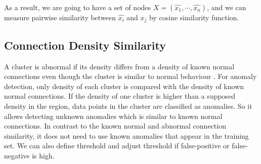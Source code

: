 As a result, we are going to have a set of nodes $X = (\hat{x_1}, \cdots, \hat{x_n})$, and we can measure pairwise similarity between $\hat{x_i}$ and $\hat{x_j}$ by cosine similarity function. 
%

\subsection{Connection Density Similarity}
\label{subsec:densitysimilarity}
A cluster is abnormal if its density differs from a density of known normal connections even though the cluster is similar to normal behaviour \cite{ester96}. 
For anomaly detection, only density of each cluster is compared with the density of known normal connections. 
If the density of one cluster is higher than a supposed density in the region, data points in the cluster are classified as anomalies. 
So it allows detecting unknown anomalies which is similar to known normal connections. 
In contrast to the known normal and abnormal connection similarity, it does not need to use known anomalies that appear in the training set. 
We can also define threshold and adjust threshold if false-positive or false-negative is high. 

